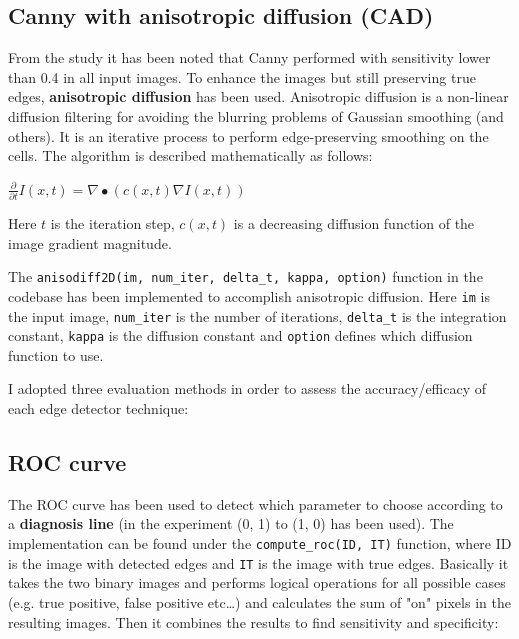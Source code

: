 \documentclass{article}
\begin{document}
	\subsection*{Canny with anisotropic diffusion (CAD)}	
	
	From the study it has been noted that Canny performed with sensitivity lower than
	0.4 in all input images. To enhance the images but still preserving true edges,
	\textbf{anisotropic diffusion} has been used.
	Anisotropic diffusion is a non-linear diffusion filtering for avoiding the
	blurring problems of Gaussian smoothing (and others). It is an iterative
	process to perform edge-preserving smoothing on the cells.
	The algorithm is described mathematically as follows:
	
	\begin{center}
	$\frac{\partial}{\partial t}I(x, t) = \nabla \bullet (c(x, t) \nabla I(x, t))$
	\end{center}		
	
	Here $t$ is the iteration step, $c(x, t)$ is a decreasing diffusion function
	of the image gradient magnitude.
	
	The \verb|anisodiff2D(im, num_iter, delta_t, kappa, option)| function in the codebase
	has been implemented to accomplish anisotropic diffusion. Here \verb|im| is the
	input image, \verb|num_iter| is the number of iterations, \verb|delta_t| is
	the integration constant, \verb|kappa| is the diffusion constant and
	\verb|option| defines which diffusion function to use.
	\newline
	
	I adopted three evaluation methods in order to assess the accuracy/efficacy of each edge
	detector technique:
	
	\subsection*{ROC curve}
	
	The ROC curve has been used to detect which parameter to choose according
	to a \textbf{diagnosis line} (in the experiment
	(0, 1) to (1, 0) has been used). The implementation can be found under
	the \verb|compute_roc(ID, IT)| function, where ID is the image
	with detected edges and \verb|IT| is the image with true edges.
	Basically it takes the two binary images and performs logical operations
	for all possible cases (e.g. true positive, false positive etc\ldots) and
	calculates the sum of "on" pixels in the resulting images. Then it combines
	the results to find sensitivity and specificity:
	
\end{document}
